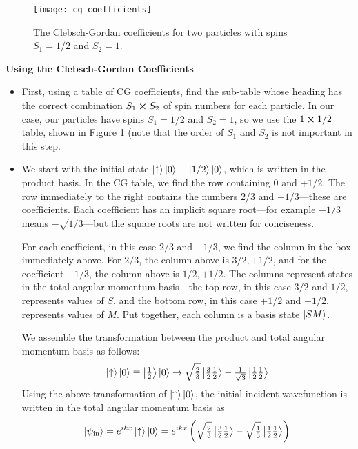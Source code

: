 \documentclass[11pt, a4paper]{article}
\newcommand{\ua}{\uparrow}  %
\begin{document}
\begin{figure}[hbtb!]
\centering
\texttt{[image: cg-coefficients]}
\caption{The Clebsch-Gordan coefficients for two particles with spins $ S_{1} = 1/2 $ and $ S_{2} = 1 $.}
\label{fig:cg}
\end{figure}
	
	
\textbf{Using the Clebsch-Gordan Coefficients}	
\begin{itemize}
	\item First, using a table of CG coefficients, find the sub-table whose heading has the correct combination $ S_{1} \cross S_{2} $ of spin numbers for each particle. In our case, our particles have spins $ S_{1} = 1/2 $ and $ S_{2} = 1 $, so we use the $ 1 \cross 1/2 $ table, shown in Figure \ref{fig:cg} (note that the order of $ S_{1} $ and $ S_{2} $ is not important in this step.
	
	\item We start with the initial state $ \ket{\ua}\ket{0} \equiv \ket{1/2}\ket{0} $, which is written in the product basis. In the CG table, we find the row containing $ 0 $ and $ +1/2 $. The row immediately to the right contains the numbers $ 2/3 $ and $ -1/3 $---these are coefficients. Each coefficient has an implicit square root---for example $ -1/3 $ means $ -\sqrt{1/3} $---but the square roots are not written for conciseness. 
	
	For each coefficient, in this case $ 2/3 $ and $ -1/3 $, we find the column in the box immediately above. For $ 2/3 $, the column above is $ 3/2, +1/2 $, and for the coefficient $ -1/3 $, the column above is $ 1/2, +1/2 $. The columns represent states in the total angular momentum basis---the top row, in this case $ 3/2 $ and $ 1/2 $, represents values of $ S $, and the bottom row, in this case $ +1/2 $ and $ +1/2 $, represents values of $ M $. Put together, each column is a basis state $ \ket{SM} $.

	We assemble the transformation between the product and total angular momentum basis as follows:
	\begin{equation*}
		\ket{\ua} \ket{0} \equiv \ket{\tfrac{1}{2}}\ket{0} \to \sqrt{\tfrac{2}{3}} \ket{\tfrac{3}{2}\tfrac{1}{2}} - \tfrac{1}{\sqrt{3}}\ket{\tfrac{1}{2}\tfrac{1}{2}}
	\end{equation*}
	Using the above transformation of $ \ket{\ua}\ket{0} $, the initial incident wavefunction is written in the total angular momentum basis as
	\begin{equation*}
		\ket{\psi_{\text{in}}} = e^{ikx}\ket{\ua} \ket{0} = e^{ikx}\left(\sqrt{\tfrac{2}{3}} \ket{\tfrac{3}{2}\tfrac{1}{2}} - \sqrt{\tfrac{1}{3}}\ket{\tfrac{1}{2}\tfrac{1}{2}}\right)
	\end{equation*}
	

\end{itemize}
\end{document}
